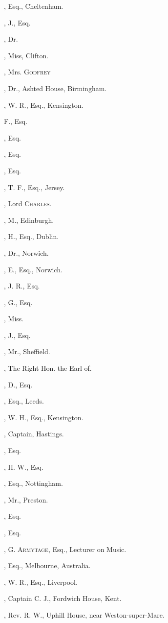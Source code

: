 \begin{multicols}{2}
, Esq., Cheltenham.

, J., Esq.

, Dr.

, Miss, Clifton.

, Mrs. \textsc{Godfrey}

, Dr., Ashted House, Birmingham.

, W. R., Esq., Kensington.

 F., Esq.

, Esq.

, Esq.

, Esq.

, T. F., Esq., Jersey.

, Lord \textsc{Charles}.

, M., Edinburgh.

, H., Esq., Dublin.

, Dr., Norwich.

, E., Esq., Norwich.

, J. R., Esq.

, G., Esq.

, Miss.

, J., Esq.

, Mr., Sheffield.
\bigskip

, The Right Hon. the Earl of.

, D., Esq.

, Esq., Leeds.

, W. H., Esq., Kensington.

, Captain, Hastings.

, Esq.

, H. W., Esq.

, Esq., Nottingham.

, Mr., Preston.

, Esq.

, Esq.

, G. \textsc{Armytage}, Esq., Lecturer on
Music.

, Esq., Melbourne, Australia.

, W. R., Esq., Liverpool.

, Captain C. J., Fordwich House,
Kent.

, Rev. R. W., Uphill House, near
Weston-super-Mare.
\end{multicols}
\pagebreak